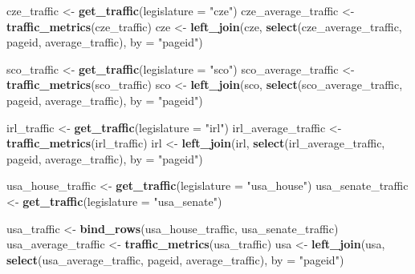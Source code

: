\documentclass[
]{article}
\newenvironment{Shaded}{\begin{snugshade}}{\end{snugshade}}
\newcommand{\AttributeTok}[1]{\textcolor[rgb]{0.13,0.29,0.53}{#1}}
\newcommand{\FunctionTok}[1]{\textcolor[rgb]{0.13,0.29,0.53}{\textbf{#1}}}
\newcommand{\NormalTok}[1]{#1}
\newcommand{\OtherTok}[1]{\textcolor[rgb]{0.56,0.35,0.01}{#1}}
\newcommand{\StringTok}[1]{\textcolor[rgb]{0.31,0.60,0.02}{#1}}
\begin{document}
\begin{Shaded}
\begin{Highlighting}[]
\NormalTok{cze\_traffic }\OtherTok{\textless{}{-}} \FunctionTok{get\_traffic}\NormalTok{(}\AttributeTok{legislature =} \StringTok{"cze"}\NormalTok{)}
\NormalTok{cze\_average\_traffic }\OtherTok{\textless{}{-}} \FunctionTok{traffic\_metrics}\NormalTok{(cze\_traffic)}
\NormalTok{cze }\OtherTok{\textless{}{-}} \FunctionTok{left\_join}\NormalTok{(cze, }\FunctionTok{select}\NormalTok{(cze\_average\_traffic, pageid, average\_traffic), }\AttributeTok{by =} \StringTok{"pageid"}\NormalTok{)}

\NormalTok{sco\_traffic }\OtherTok{\textless{}{-}} \FunctionTok{get\_traffic}\NormalTok{(}\AttributeTok{legislature =} \StringTok{"sco"}\NormalTok{)}
\NormalTok{sco\_average\_traffic }\OtherTok{\textless{}{-}} \FunctionTok{traffic\_metrics}\NormalTok{(sco\_traffic)}
\NormalTok{sco }\OtherTok{\textless{}{-}} \FunctionTok{left\_join}\NormalTok{(sco, }\FunctionTok{select}\NormalTok{(sco\_average\_traffic, pageid, average\_traffic), }\AttributeTok{by =} \StringTok{"pageid"}\NormalTok{)}

\NormalTok{irl\_traffic }\OtherTok{\textless{}{-}} \FunctionTok{get\_traffic}\NormalTok{(}\AttributeTok{legislature =} \StringTok{"irl"}\NormalTok{)}
\NormalTok{irl\_average\_traffic }\OtherTok{\textless{}{-}} \FunctionTok{traffic\_metrics}\NormalTok{(irl\_traffic)}
\NormalTok{irl }\OtherTok{\textless{}{-}} \FunctionTok{left\_join}\NormalTok{(irl, }\FunctionTok{select}\NormalTok{(irl\_average\_traffic, pageid, average\_traffic), }\AttributeTok{by =} \StringTok{"pageid"}\NormalTok{)}

\NormalTok{usa\_house\_traffic }\OtherTok{\textless{}{-}} \FunctionTok{get\_traffic}\NormalTok{(}\AttributeTok{legislature =} \StringTok{"usa\_house"}\NormalTok{)}
\NormalTok{usa\_senate\_traffic }\OtherTok{\textless{}{-}} \FunctionTok{get\_traffic}\NormalTok{(}\AttributeTok{legislature =} \StringTok{"usa\_senate"}\NormalTok{)}

\NormalTok{usa\_traffic }\OtherTok{\textless{}{-}} \FunctionTok{bind\_rows}\NormalTok{(usa\_house\_traffic, usa\_senate\_traffic)}
\NormalTok{usa\_average\_traffic }\OtherTok{\textless{}{-}} \FunctionTok{traffic\_metrics}\NormalTok{(usa\_traffic)}
\NormalTok{usa }\OtherTok{\textless{}{-}} \FunctionTok{left\_join}\NormalTok{(usa, }\FunctionTok{select}\NormalTok{(usa\_average\_traffic, pageid, average\_traffic), }\AttributeTok{by =} \StringTok{"pageid"}\NormalTok{)}
\end{Highlighting}
\end{Shaded}
\end{document}
